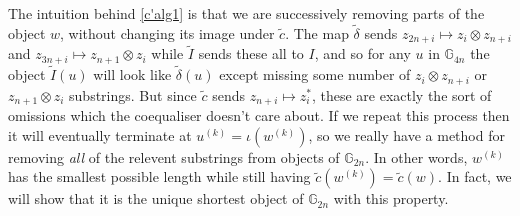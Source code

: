 The intuition behind \cref{c'alg1} is that we are successively removing parts of the object $w$, without changing its image under $\tilde{c}$. The map $\tilde{\delta}$ sends $z_{2n+i} \mapsto z_i \otimes z_{n+i}$ and $z_{3n+i} \mapsto z_{n+1} \otimes z_i$ while $\tilde{I}$ sends these all to $I$, and so for any $u$ in $\mathbb{G}_{4n}$ the object $\tilde{I}(u)$ will look like $\tilde{\delta}(u)$ except missing some number of $z_i \otimes z_{n+i}$ or $z_{n+1} \otimes z_i$ substrings. But since $\tilde{c}$ sends $z_{n+i} \mapsto z_i^*$, these are exactly the sort of omissions which the coequaliser doesn't care about. If we repeat this process then it will eventually terminate at $u^{(k)} = \iota(w^{(k)})$, so we really have a method for removing \emph{all} of the relevent substrings from objects of $\mathbb{G}_{2n}$. In other words, $w^{(k)}$ has the smallest possible length while still having $\tilde{c}(w^{(k)}) = \tilde{c}(w)$. In fact, we will show that it is the unique shortest object of $\mathbb{G}_{2n}$ with this property.

